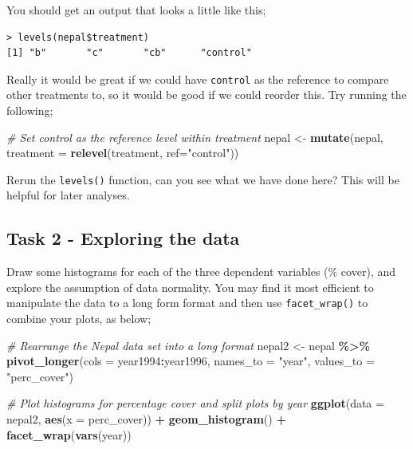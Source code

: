 \documentclass[
]{book}
\newenvironment{Shaded}{\begin{snugshade}}{\end{snugshade}}
\newcommand{\AttributeTok}[1]{\textcolor[rgb]{0.13,0.29,0.53}{#1}}
\newcommand{\CommentTok}[1]{\textcolor[rgb]{0.56,0.35,0.01}{\textit{#1}}}
\newcommand{\FunctionTok}[1]{\textcolor[rgb]{0.13,0.29,0.53}{\textbf{#1}}}
\newcommand{\NormalTok}[1]{#1}
\newcommand{\OtherTok}[1]{\textcolor[rgb]{0.56,0.35,0.01}{#1}}
\newcommand{\SpecialCharTok}[1]{\textcolor[rgb]{0.81,0.36,0.00}{\textbf{#1}}}
\newcommand{\StringTok}[1]{\textcolor[rgb]{0.31,0.60,0.02}{#1}}
\begin{document}
\begin{Shaded}
\end{Shaded}

You should get an output that looks a little like this;

\begin{verbatim}
> levels(nepal$treatment)
[1] "b"       "c"       "cb"      "control"
\end{verbatim}

Really it would be great if we could have \texttt{control} as the reference to compare other treatments to, so it would be good if we could reorder this. Try running the following;

\begin{Shaded}
\begin{Highlighting}[]
\CommentTok{\# Set control as the reference level within treatment}
\NormalTok{nepal }\OtherTok{\textless{}{-}} \FunctionTok{mutate}\NormalTok{(nepal, }\AttributeTok{treatment =} \FunctionTok{relevel}\NormalTok{(treatment, }\AttributeTok{ref=}\StringTok{"control"}\NormalTok{))}
\end{Highlighting}
\end{Shaded}

Rerun the \texttt{levels()} function, can you see what we have done here? This will be helpful for later analyses.

\subsection{Task 2 - Exploring the data}\label{task-2---exploring-the-data-1}

Draw some histograms for each of the three dependent variables (\% cover), and explore the assumption of data normality. You may find it most efficient to manipulate the data to a long form format and then use \texttt{facet\_wrap()} to combine your plots, as below;

\begin{Shaded}
\begin{Highlighting}[]
\CommentTok{\# Rearrange the Nepal data set into a long format}
\NormalTok{nepal2 }\OtherTok{\textless{}{-}}\NormalTok{ nepal }\SpecialCharTok{\%\textgreater{}\%}
  \FunctionTok{pivot\_longer}\NormalTok{(}\AttributeTok{cols =}\NormalTok{ year1994}\SpecialCharTok{:}\NormalTok{year1996,}
               \AttributeTok{names\_to =} \StringTok{"year"}\NormalTok{, }
               \AttributeTok{values\_to =} \StringTok{"perc\_cover"}\NormalTok{)}

\CommentTok{\# Plot histograms for percentage cover and split plots by year}
\FunctionTok{ggplot}\NormalTok{(}\AttributeTok{data =}\NormalTok{ nepal2, }\FunctionTok{aes}\NormalTok{(}\AttributeTok{x =}\NormalTok{ perc\_cover)) }\SpecialCharTok{+}
  \FunctionTok{geom\_histogram}\NormalTok{() }\SpecialCharTok{+}
  \FunctionTok{facet\_wrap}\NormalTok{(}\FunctionTok{vars}\NormalTok{(year))}
\end{Highlighting}
\end{Shaded}
\end{document}
